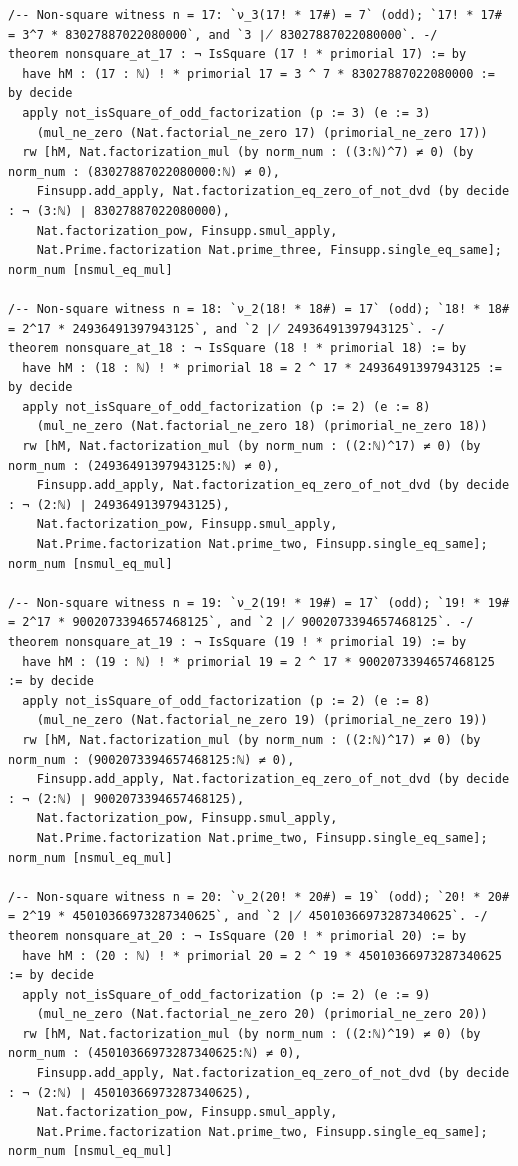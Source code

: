 \documentclass[11pt]{article}
\theoremstyle{definition}
\begin{document}
\begin{lstlisting}
/-- Non-square witness n = 17: `ν_3(17! * 17#) = 7` (odd); `17! * 17# = 3^7 * 83027887022080000`, and `3 ∤ 83027887022080000`. -/
theorem nonsquare_at_17 : ¬ IsSquare (17 ! * primorial 17) := by
  have hM : (17 : ℕ) ! * primorial 17 = 3 ^ 7 * 83027887022080000 := by decide
  apply not_isSquare_of_odd_factorization (p := 3) (e := 3)
    (mul_ne_zero (Nat.factorial_ne_zero 17) (primorial_ne_zero 17))
  rw [hM, Nat.factorization_mul (by norm_num : ((3:ℕ)^7) ≠ 0) (by norm_num : (83027887022080000:ℕ) ≠ 0),
    Finsupp.add_apply, Nat.factorization_eq_zero_of_not_dvd (by decide : ¬ (3:ℕ) ∣ 83027887022080000),
    Nat.factorization_pow, Finsupp.smul_apply,
    Nat.Prime.factorization Nat.prime_three, Finsupp.single_eq_same]; norm_num [nsmul_eq_mul]

/-- Non-square witness n = 18: `ν_2(18! * 18#) = 17` (odd); `18! * 18# = 2^17 * 24936491397943125`, and `2 ∤ 24936491397943125`. -/
theorem nonsquare_at_18 : ¬ IsSquare (18 ! * primorial 18) := by
  have hM : (18 : ℕ) ! * primorial 18 = 2 ^ 17 * 24936491397943125 := by decide
  apply not_isSquare_of_odd_factorization (p := 2) (e := 8)
    (mul_ne_zero (Nat.factorial_ne_zero 18) (primorial_ne_zero 18))
  rw [hM, Nat.factorization_mul (by norm_num : ((2:ℕ)^17) ≠ 0) (by norm_num : (24936491397943125:ℕ) ≠ 0),
    Finsupp.add_apply, Nat.factorization_eq_zero_of_not_dvd (by decide : ¬ (2:ℕ) ∣ 24936491397943125),
    Nat.factorization_pow, Finsupp.smul_apply,
    Nat.Prime.factorization Nat.prime_two, Finsupp.single_eq_same]; norm_num [nsmul_eq_mul]

/-- Non-square witness n = 19: `ν_2(19! * 19#) = 17` (odd); `19! * 19# = 2^17 * 9002073394657468125`, and `2 ∤ 9002073394657468125`. -/
theorem nonsquare_at_19 : ¬ IsSquare (19 ! * primorial 19) := by
  have hM : (19 : ℕ) ! * primorial 19 = 2 ^ 17 * 9002073394657468125 := by decide
  apply not_isSquare_of_odd_factorization (p := 2) (e := 8)
    (mul_ne_zero (Nat.factorial_ne_zero 19) (primorial_ne_zero 19))
  rw [hM, Nat.factorization_mul (by norm_num : ((2:ℕ)^17) ≠ 0) (by norm_num : (9002073394657468125:ℕ) ≠ 0),
    Finsupp.add_apply, Nat.factorization_eq_zero_of_not_dvd (by decide : ¬ (2:ℕ) ∣ 9002073394657468125),
    Nat.factorization_pow, Finsupp.smul_apply,
    Nat.Prime.factorization Nat.prime_two, Finsupp.single_eq_same]; norm_num [nsmul_eq_mul]

/-- Non-square witness n = 20: `ν_2(20! * 20#) = 19` (odd); `20! * 20# = 2^19 * 45010366973287340625`, and `2 ∤ 45010366973287340625`. -/
theorem nonsquare_at_20 : ¬ IsSquare (20 ! * primorial 20) := by
  have hM : (20 : ℕ) ! * primorial 20 = 2 ^ 19 * 45010366973287340625 := by decide
  apply not_isSquare_of_odd_factorization (p := 2) (e := 9)
    (mul_ne_zero (Nat.factorial_ne_zero 20) (primorial_ne_zero 20))
  rw [hM, Nat.factorization_mul (by norm_num : ((2:ℕ)^19) ≠ 0) (by norm_num : (45010366973287340625:ℕ) ≠ 0),
    Finsupp.add_apply, Nat.factorization_eq_zero_of_not_dvd (by decide : ¬ (2:ℕ) ∣ 45010366973287340625),
    Nat.factorization_pow, Finsupp.smul_apply,
    Nat.Prime.factorization Nat.prime_two, Finsupp.single_eq_same]; norm_num [nsmul_eq_mul]


\end{lstlisting}
\end{document}
